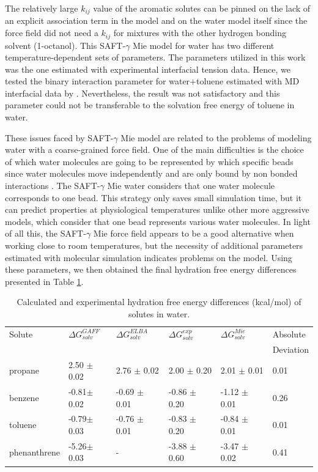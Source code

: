 The relatively large $k_{ij}$ value of the aromatic solutes can be pinned on the lack of an explicit association term in the model and on the water model itself since the force field did not need a $k_{ij}$ for mixtures with the other hydrogen bonding solvent (1-octanol).  This SAFT-$\gamma$ Mie model for water \cite{lobanova2016} has two different temperature-dependent sets of parameters. The parameters utilized in this work was the one estimated with experimental interfacial tension data. Hence, we tested the binary interaction parameter for water+toluene estimated with MD interfacial data by . Nevertheless, the result was not satisfactory and this parameter could not be transferable to the solvation free energy of toluene in water. 

These issues faced by SAFT-$\gamma$ Mie model are related to the problems of modeling water with a coarse-grained force field. One of the main difficulties is the choice of which water molecules are going to be represented by which specific beads since water molecules move independently and are only bound by non bonded interactions \cite{hadley2010,hadley2012}. The  SAFT-$\gamma$ Mie water considers that one water molecule corresponds to one bead. This strategy only saves small simulation time, but it can predict properties at physiological temperatures unlike other more aggressive models, which consider that one bead represents various water molecules. In light of all this, the SAFT-$\gamma$ Mie force field appears to be a good alternative when working close to room temperatures, but the necessity of additional parameters estimated with molecular simulation indicates problems on the model. Using these parameters, we then obtained the final hydration free energy differences presented in Table \ref{tbl:solv2}. 

\begin{table}[H]
  \centering
  \caption{Calculated and experimental hydration free energy differences  (kcal/mol) of solutes in water.}
  \label{tbl:solv2}
  \begin{tabular}{llllll}
    \hline
    \hline
     Solute      & $\Delta G_{solv}^{GAFF}$ & $\Delta G_{solv}^{ELBA}$ & $\Delta G_{solv}^{exp}$ & $\Delta G_{solv}^{Mie}$ & Absolute \\
     & & & & & Deviation \\
    \hline
    propane          &2.50 $\pm$0.02 & 2.76 $\pm$ 0.02&  2.00 $\pm$ 0.20 & 2.01 $\pm$ 0.01     & 0.01 \\
    benzene          &-0.81$\pm$0.02& -0.69 $\pm$ 0.01& -0.86 $\pm$ 0.20 & -1.12 $\pm$ 0.01    &  0.26\\  
    toluene          &-0.79$\pm$0.03& -0.76 $\pm$ 0.01& -0.83 $\pm$ 0.20 & -0.84 $\pm$ 0.01    &  0.01\\
    phenanthrene    &-5.26$\pm$0.03& -                & -3.88 $\pm$ 0.60 & -3.47 $\pm$ 0.02    & 0.41 \\
    \hline
    \hline
  \end{tabular}

\end{table}

